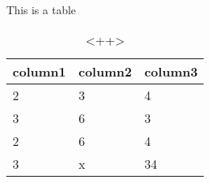 \documentclass{article}
\begin{document}
This is a table

\begin{table}[H]
	\centering
	\begin{tabular}{ l l l }
		\hline
		\textbf{column1} & \textbf{column2} & \textbf{column3}\\
		\hline
		2 & 3 & 4\\
		3 & 6 & 3\\
		2 & 6 & 4\\
		3 & x & 34\\
		\hline
	\end{tabular}
	\caption{<++>}
	\label{tab:data}
\end{table}
\end{document}
